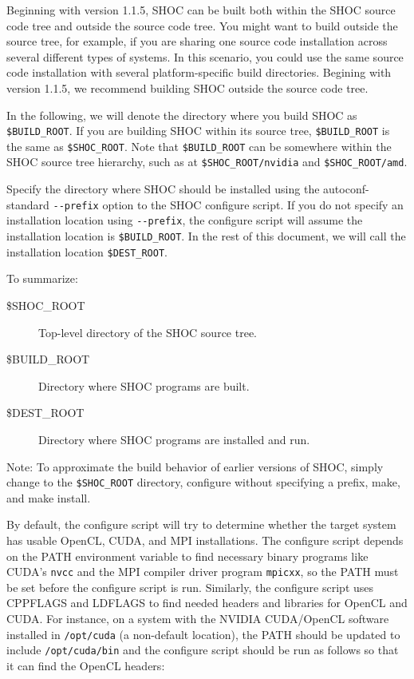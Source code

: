 \documentclass[11pt]{article}
\begin{document}
Beginning with version 1.1.5, SHOC can be built both within the SHOC source 
code tree and outside the source code tree.
You might want to build outside the source tree, for example, if you are 
sharing one source code installation across several different types of systems.
In this scenario, you could use the same source code installation with 
several platform-specific build directories.
Begining with version 1.1.5, we recommend building SHOC outside the source
code tree.

In the following, we will denote the directory where you build SHOC 
as \verb+$BUILD_ROOT+.
If you are building SHOC within its source tree, \verb+$BUILD_ROOT+ is
the same as \verb+$SHOC_ROOT+.
Note that \verb+$BUILD_ROOT+ can be somewhere within the SHOC source tree
hierarchy, such as at \verb+$SHOC_ROOT/nvidia+ and \verb+$SHOC_ROOT/amd+.

Specify the directory where SHOC should be installed using the 
autoconf-standard \verb+--prefix+ option to the SHOC configure script.
If you do not specify an installation location using \verb+--prefix+, the
configure script will assume the installation location is \verb+$BUILD_ROOT+.
In the rest of this document, we will call the installation location
\verb+$DEST_ROOT+.

To summarize:
\begin{description}
\item [\$SHOC\_ROOT] Top-level directory of the SHOC source tree.
\item [\$BUILD\_ROOT] Directory where SHOC programs are built.
\item [\$DEST\_ROOT] Directory where SHOC programs are installed and run.
\end{description}

\begin{framed}
Note: To approximate the build behavior of earlier versions of SHOC,
simply change to the \verb+$SHOC_ROOT+ directory, configure without specifying a
prefix, make, and make install.
\end{framed}

By default, the configure script will try to determine whether the 
target system has usable OpenCL, CUDA, and MPI installations.  
The configure script depends on the PATH environment variable to find necessary
binary programs like CUDA's \verb+nvcc+ and the MPI compiler driver
program \verb+mpicxx+, so the PATH must be set before the configure script is
run.
Similarly, the configure script uses CPPFLAGS and LDFLAGS to find needed
headers and libraries for OpenCL and CUDA.
For instance, on a system with the NVIDIA CUDA/OpenCL software installed
in \verb+/opt/cuda+ (a non-default location), the PATH should be updated to include
\verb+/opt/cuda/bin+ and the configure script should be run as follows so that it can
find the OpenCL headers:
\end{document}
